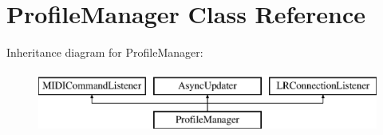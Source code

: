 \hypertarget{class_profile_manager}{}\section{Profile\+Manager Class Reference}
\label{class_profile_manager}
Inheritance diagram for Profile\+Manager\+:\begin{figure}[H]
\begin{center}
\leavevmode
\includegraphics[height=2.000000cm]{class_profile_manager}
\end{center}
\end{figure}
